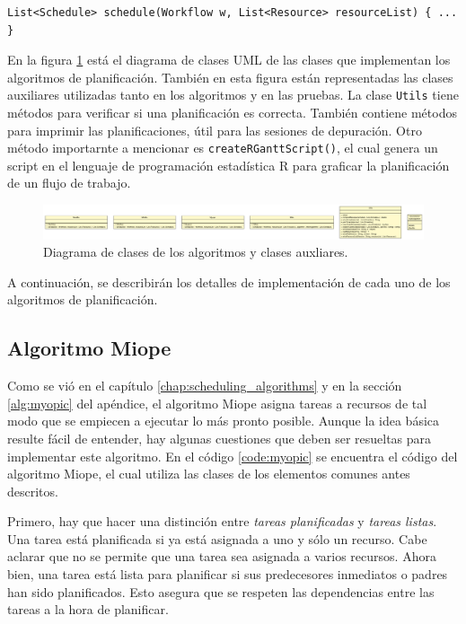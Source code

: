 \begin{center}
\begin{lstlisting}[numbers=none]
List<Schedule> schedule(Workflow w, List<Resource> resourceList) { ... }
\end{lstlisting}
\end{center}

En la figura \ref{fig:uml_class_scheduler} está el diagrama de clases UML de las clases que implementan los algoritmos de planificación. También en esta figura están representadas las clases auxiliares utilizadas tanto en los algoritmos y en las pruebas. La clase \texttt{Utils} tiene métodos para verificar si una planificación es correcta. También contiene métodos para imprimir las planificaciones, útil para las sesiones de depuración. Otro método importarnte a mencionar es \texttt{createRGanttScript()}, el cual genera un script en el lenguaje de programación estadística R \cite{Rlang2014} para graficar la planificación de un flujo de trabajo.

\begin{figure}
\begin{center}
\includegraphics[width=1.0\textwidth]{imagenes/uml_class_scheduler}
\end{center}
\label{fig:uml_class_scheduler}
\caption{Diagrama de clases de los algoritmos y clases auxliares.}
\end{figure}

A continuación, se describirán los detalles de implementación de cada uno de los algoritmos de planificación.

\subsection{Algoritmo Miope}
Como se vió en el capítulo \ref{chap:scheduling_algorithms} y en la sección \ref{alg:myopic} del apéndice, el algoritmo Miope asigna tareas a recursos de tal modo que se empiecen a ejecutar lo más pronto posible. Aunque la idea básica resulte fácil de entender, hay algunas cuestiones que deben ser resueltas para implementar este algoritmo. En el código \ref{code:myopic} se encuentra el código del algoritmo Miope, el cual utiliza las clases de los elementos comunes antes descritos. 

Primero, hay que hacer una distinción entre \emph{tareas planificadas} y \emph{tareas listas}. Una tarea está planificada si ya está asignada a uno y sólo un recurso. Cabe aclarar que no se permite que una tarea sea asignada a varios recursos. Ahora bien, una tarea está lista para planificar si sus predecesores inmediatos o padres han sido planificados. Esto asegura que se respeten las dependencias entre las tareas a la hora de planificar.

